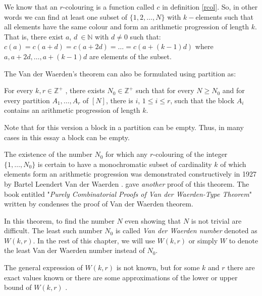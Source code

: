 
We know that an $r$-colouring is a function called $c$ in definition \eqref{rcol}. So, in other words we can find at least one subset of $\{1,2,\ldots,N\}$ with $k-$elements such that all elements have the same colour and form an arithmetic progression of length $k$. That is, there exist
$a$,  $d \ \in \mathbb{N}$ with $d\neq 0$ such that: $c(a)=c(a+d)=c(a+2d)=\ldots =c(a+(k-1)d)$ where $a, a+2d, \ldots, a+(k-1)d$ are elements of the subset.

The Van der Waerden's theorem can also be formulated using partition \citep{dransfield2004} as:

\begin{thm}
For every $k, r \in \mathbb{Z}^+$ , there exists $N_0 \in \mathbb{Z}^+$ such that for every $N \geq N_0$ and for every partition $A_1, \ldots , A_r$ of $[N]$, there is $i$, $1 \leq i \leq r$, such that the block $A_i$ contains an arithmetic progression of  length $k.$   \label{vd2}
\end{thm}

Note that for this version a block in a partition can be empty. Thus, in many cases in this essay a block can be empty.

The existence of the number $N_0$ for which any $r$-colouring of the integer $\{1, \ldots, N_0 \}$ is certain to have a monochromatic subset of cardinality $k$ of which elements form an arithmetic progression was demonstrated constructively in 1927 by Bartel Leendert Van der Waerden  \citep{van1927beweis}. 
\cite{graham1974short} gave \emph{another} proof of this theorem. The book entitled "\textit{Purely Combinatorial Proofs of Van der Waerden-Type Theorem}" written by \cite{gasarch2010purely} condenses  the proof of Van der Waerden theorem.

In this theorem, to find the number $N$ even showing that $N$ is not trivial are difficult. The least such number $N_0$ is called \textit{Van der Waerden number} denoted as $W(k,r).$ In the rest of this chapter, we will use $W(k,r)$ or simply $W$ to denote the least Van der Waerden number instead of $N_0.$

The general expression of $W(k,r)$ is not known, but for some $k$ and $r$ there are exact values known or there are some approximations of the  lower or upper bound of $W(k,r)$  \citep{dransfield2004}.

